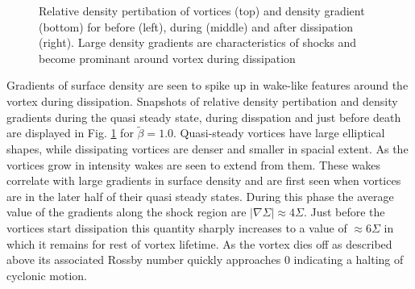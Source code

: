 \begin{figure}
{  }
\hfill
  \caption{Relative density pertibation of vortices (top) and density gradient
 (bottom) for before (left), during (middle) and after dissipation (right).
 Large density gradients are characteristics of shocks and become prominant
 around vortex during dissipation} \label{shockplot}
\end{figure}


Gradients of surface density are seen to
spike up in wake-like features around the vortex during dissipation. 
Snapshots of relative density pertibation and density gradients during the
quasi steady state, during disspation and just before death are displayed in
Fig. \ref{shockplot} for $\tilde\beta=1.0$. Quasi-steady vortices have large 
elliptical shapes, while dissipating vortices are denser and smaller in spacial
extent.
As the vortices grow in intensity wakes are seen to extend from them. These
wakes correlate with large gradients in surface density and are first seen
when vortices are in the later half of their quasi steady states. During this
phase the average value of the gradients along the shock region are
$|\nabla\Sigma| \approx 4 \Sigma$. Just before the vortices start dissipation
this quantity sharply increases to a value of $ \approx6 \Sigma$ in which it
 remains for rest of vortex lifetime.  
As the vortex dies off as described above its associated Rossby number quickly
approaches $0$ indicating a halting of cyclonic motion.


